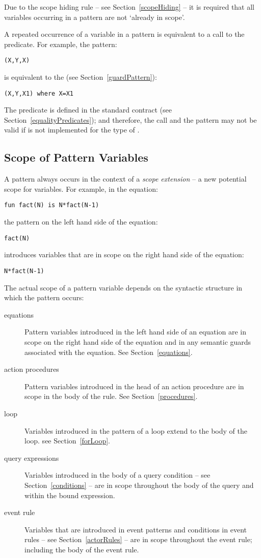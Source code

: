 Due to the scope hiding rule -- see Section~\vref{scopeHiding} -- it is required that all variables occurring in a pattern are not `already in scope'.

\begin{aside}
A repeated occurrence of a variable in a pattern is equivalent to a call to the \q{=} predicate. For example, the pattern:
\begin{lstlisting}
(X,Y,X)
\end{lstlisting}
is equivalent to the  (see Section~\vref{guardPattern}):
\begin{lstlisting}
(X,Y,X1) where X=X1
\end{lstlisting}
The \q{=} predicate is defined in the standard  contract (see Section~\vref{equalityPredicates}); and therefore, the call and the pattern may not be valid if  is not implemented for the type of .
\end{aside}

\subsection{Scope of Pattern Variables}
A pattern always occurs in the context of a \emph{scope extension} -- a new potential scope for variables. For example, in the equation:
\begin{lstlisting}
fun fact(N) is N*fact(N-1)
\end{lstlisting}
the pattern on the left hand side of the equation:
\begin{lstlisting}
fact(N)
\end{lstlisting}
introduces variables that are in scope on the right hand side of the equation:
\begin{lstlisting}
N*fact(N-1)
\end{lstlisting}

The actual scope of a pattern variable depends on the syntactic structure in which the pattern occurs: 
\begin{description}
\item[equations]
Pattern variables introduced in the left hand side of an equation are in scope on the right hand side of the equation and in any semantic guards associated with the equation. See Section~\vref{equations}.
\item[action procedures]
Pattern variables introduced in the head of an action procedure are in scope in the body of the rule. See Section~\vref{procedures}.
\item[ loop]
Variables introduced in the pattern of a  loop extend to the body of the loop. see Section~\vref{forLoop}.
\item[query expressions]
Variables introduced in the body of a query condition -- see Section~\vref{conditions} -- are in scope throughout the body of the query and within the bound expression.
\item[event rule]
Variables that are introduced in event patterns and conditions in event rules -- see Section~\vref{actorRules} -- are in scope throughout the event rule; including the body of the event rule.
\end{description}

